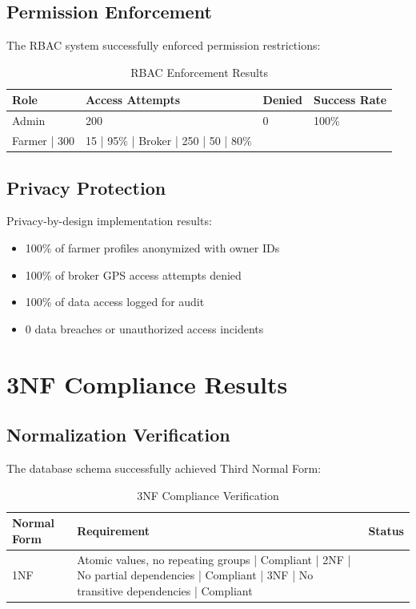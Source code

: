 \subsection{Permission Enforcement}

The RBAC system successfully enforced permission restrictions:

\begin{table}[H]
\centering
\begin{tabular}{|l|l|l|l|}
\hline
\textbf{Role} & \textbf{Access Attempts} & \textbf{Denied} & \textbf{Success Rate} \\
\hline
Admin & 200 & 0 & 100\% \\
Farmer | 300 & 15 | 95\% |
Broker | 250 | 50 | 80\% \\
\hline
\end{tabular}
\caption{RBAC Enforcement Results}
\end{table}

\subsection{Privacy Protection}

Privacy-by-design implementation results:

\begin{itemize}
    \item 100\% of farmer profiles anonymized with owner IDs
    \item 100\% of broker GPS access attempts denied
    \item 100\% of data access logged for audit
    \item 0 data breaches or unauthorized access incidents
\end{itemize}

\section{3NF Compliance Results}

\subsection{Normalization Verification}

The database schema successfully achieved Third Normal Form:

\begin{table}[H]
\centering
\begin{tabular}{|l|l|l|}
\hline
\textbf{Normal Form} & \textbf{Requirement} & \textbf{Status} \\
\hline
1NF & Atomic values, no repeating groups | Compliant |
2NF | No partial dependencies | Compliant |
3NF | No transitive dependencies | Compliant \\
\hline
\end{tabular}
\caption{3NF Compliance Verification}
\end{table}

